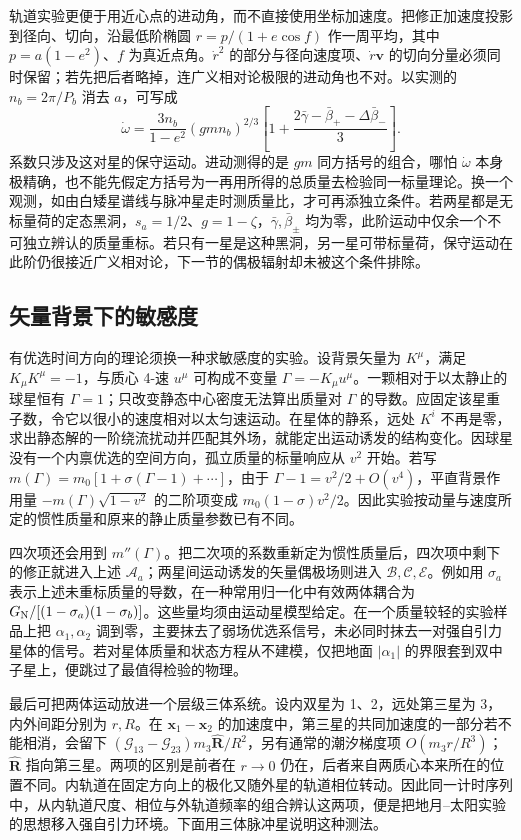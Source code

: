 轨道实验更便于用近心点的进动角，而不直接使用坐标加速度。把修正加速度投影到径向、切向，沿最低阶椭圆 $r=p/(1+e\cos f)$ 作一周平均，其中 $p=a(1-e^2)$、$f$ 为真近点角。$\dot r^2$ 的部分与径向速度项、$\dot r\bm v$ 的切向分量必须同时保留；若先把后者略掉，连广义相对论极限的进动角也不对。以实测的 $n_b=2\pi/P_b$ 消去 $a$，可写成
\[
 \dot\omega
 =\frac{3n_b}{1-e^2}(gmn_b)^{2/3}
       \left[1+\frac{2\bar\gamma-\bar\beta_+-\Delta\bar\beta_-}{3}\right].
\]
系数只涉及这对星的保守运动。进动测得的是 $gm$ 同方括号的组合，哪怕 $\dot\omega$ 本身极精确，也不能先假定方括号为一再用所得的总质量去检验同一标量理论。换一个观测，如由白矮星谱线与脉冲星走时测质量比，才可再添独立条件。若两星都是无标量荷的定态黑洞，$s_a=1/2$、$g=1-\zeta$，$\bar\gamma,\bar\beta_\pm$ 均为零，此阶运动中仅余一个不可独立辨认的质量重标。若只有一星是这种黑洞，另一星可带标量荷，保守运动在此阶仍很接近广义相对论，下一节的偶极辐射却未被这个条件排除。

\subsection{矢量背景下的敏感度}

有优选时间方向的理论须换一种求敏感度的实验。设背景矢量为 $K^\mu$，满足 $K_\mu K^\mu=-1$，与质心 4-速 $u^\mu$ 可构成不变量 $\Gamma=-K_\mu u^\mu$。一颗相对于以太静止的球星恒有 $\Gamma=1$；只改变静态中心密度无法算出质量对 $\Gamma$ 的导数。应固定该星重子数，令它以很小的速度相对以太匀速运动。在星体的静系，远处 $K^i$ 不再是零，求出静态解的一阶绕流扰动并匹配其外场，就能定出运动诱发的结构变化。因球星没有一个内禀优选的空间方向，孤立质量的标量响应从 $v^2$ 开始。若写 $m(\Gamma)=m_0[1+\sigma(\Gamma-1)+\cdots]$，由于 $\Gamma-1=v^2/2+O(v^4)$，平直背景作用量 $-m(\Gamma)\sqrt{1-v^2}$ 的二阶项变成 $m_0(1-\sigma)v^2/2$。因此实验按动量与速度所定的惯性质量和原来的静止质量参数已有不同。

四次项还会用到 $m''(\Gamma)$。把二次项的系数重新定为惯性质量后，四次项中剩下的修正就进入上述 $\mathcal A_a$；两星间运动诱发的矢量偶极场则进入 $\mathcal B,\mathcal C,\mathcal E$。例如用 $\sigma_a$ 表示上述未重标质量的导数，在一种常用归一化中有效两体耦合为 $G_{\rm N}/[(1-\sigma_a)(1-\sigma_b)]$。这些量均须由运动星模型给定。在一个质量较轻的实验样品上把 $\alpha_1,\alpha_2$ 调到零，主要抹去了弱场优选系信号，未必同时抹去一对强自引力星体的信号。若对星体质量和状态方程从不建模，仅把地面 $|\alpha_1|$ 的界限套到双中子星上，便跳过了最值得检验的物理。

最后可把两体运动放进一个层级三体系统。设内双星为 1、2，远处第三星为 3，内外间距分别为 $r,R$。在 $\bm x_1-\bm x_2$ 的加速度中，第三星的共同加速度的一部分若不能相消，会留下 $(\mathcal G_{13}-\mathcal G_{23})m_3\hat{\bm R}/R^2$，另有通常的潮汐梯度项 $O(m_3r/R^3)$；$\hat{\bm R}$ 指向第三星。两项的区别是前者在 $r\to0$ 仍在，后者来自两质心本来所在的位置不同。内轨道在固定方向上的极化又随外星的轨道相位转动。因此同一计时序列中，从内轨道尺度、相位与外轨道频率的组合辨认这两项，便是把地月--太阳实验的思想移入强自引力环境。下面用三体脉冲星说明这种测法。

